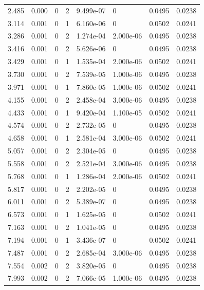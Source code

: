 \documentclass[preview]{standalone}
\begin{document}
{{\begin{tabular}{L{1.2cm}C{1.2cm} C{0.3cm}C{0.5cm} C{1.4cm}C{1.4cm} C{1.4cm}C{1.4cm}}
  2.485  &  0.000  & 0     &  2 &  9.499e-07  & 0  & 0.0495 &  0.0238   \\ 
  3.114  &  0.001  & 0     &  1 &  6.160e-06  & 0  & 0.0502 &  0.0241   \\ 
  3.286  &  0.001  & 0     &  2 &  1.274e-04  & 2.000e-06  & 0.0495 &  0.0238   \\ 
  3.416  &  0.001  & 0     &  2 &  5.626e-06  & 0  & 0.0495 &  0.0238   \\ 
  3.429  &  0.001  & 0     &  1 &  1.535e-04  & 2.000e-06  & 0.0502 &  0.0241   \\ 
  3.730  &  0.001  & 0     &  2 &  7.539e-05  & 1.000e-06  & 0.0495 &  0.0238   \\ 
  3.971  &  0.001  & 0     &  1 &  7.860e-05  & 1.000e-06  & 0.0502 &  0.0241   \\ 
  4.155  &  0.001  & 0     &  2 &  2.458e-04  & 3.000e-06  & 0.0495 &  0.0238   \\ 
  4.433  &  0.001  & 0     &  1 &  9.420e-04  & 1.100e-05  & 0.0502 &  0.0241   \\ 
  4.574  &  0.001  & 0     &  2 &  2.732e-05  & 0  & 0.0495 &  0.0238   \\ 
  4.658  &  0.001  & 0     &  1 &  2.581e-04  & 3.000e-06  & 0.0502 &  0.0241   \\ 
  5.057  &  0.001  & 0     &  2 &  2.304e-05  & 0  & 0.0495 &  0.0238   \\ 
  5.558  &  0.001  & 0     &  2 &  2.521e-04  & 3.000e-06  & 0.0495 &  0.0238   \\ 
  5.768  &  0.001  & 0     &  1 &  1.286e-04  & 2.000e-06  & 0.0502 &  0.0241   \\ 
  5.817  &  0.001  & 0     &  2 &  2.202e-05  & 0  & 0.0495 &  0.0238   \\ 
  6.011  &  0.001  & 0     &  2 &  5.389e-07  & 0  & 0.0495 &  0.0238   \\ 
  6.573  &  0.001  & 0     &  1 &  1.625e-05  & 0  & 0.0502 &  0.0241   \\ 
  7.163  &  0.001  & 0     &  2 &  1.041e-05  & 0  & 0.0495 &  0.0238   \\ 
  7.194  &  0.001  & 0     &  1 &  3.436e-07  & 0  & 0.0502 &  0.0241   \\ 
  7.487  &  0.001  & 0     &  2 &  2.685e-04  & 3.000e-06  & 0.0495 &  0.0238   \\ 
  7.554  &  0.002  & 0     &  2 &  3.820e-05  & 0  & 0.0495 &  0.0238   \\ 
  7.993  &  0.002  & 0     &  2 &  7.066e-05  & 1.000e-06  & 0.0495 &  0.0238   \\ 

\end{tabular}}}
\end{document}
